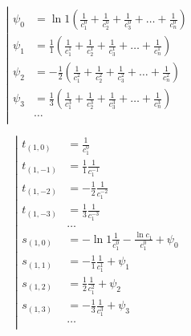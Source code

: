 \begin{equation*} \left| \begin{aligned}
\psi_0 &= \ln{1} \left(
  \frac{1}{c_1^0}
+ \frac{1}{c_2^0}
+ \frac{1}{c_3^0}
+ \ldots
+ \frac{1}{c_n^0} \right) \\
%
\psi_1 &= \frac{1}{1} \left(
  \frac{1}{c_1^1}
+ \frac{1}{c_2^1}
+ \frac{1}{c_3^1}
+ \ldots
+ \frac{1}{c_n^1} \right) \\
%
\psi_2 &= - \frac{1}{2} \left(
  \frac{1}{c_1^2}
+ \frac{1}{c_2^2}
+ \frac{1}{c_3^2}
+ \ldots
+ \frac{1}{c_n^2} \right) \\
%
\psi_3 &= \frac{1}{3} \left(
  \frac{1}{c_1^3}
+ \frac{1}{c_2^3}
+ \frac{1}{c_3^3}
+ \ldots
+ \frac{1}{c_n^3} \right) \\
%
&\ldots \\
\end{aligned} \right. \end{equation*}

\begin{equation*} \left| \begin{aligned}
t_{(1,0)} &=
  \frac{1}{c_1^0} \\
%
t_{(1,-1)} &=
  \frac{1}{1} \frac{1}{c_1^{-1}} \\
%
t_{(1,-2)} &=
  - \frac{1}{2} \frac{1}{c_1^{-2}} \\
%
t_{(1,-3)} &=
  \frac{1}{3} \frac{1}{c_1^{-3}} \\
%
&\ldots \\
%
s_{(1,0)} &=
- \ln{1} \frac{1}{c_1^0}
- \frac{\ln{c_1}}{c_1^0}
+ \psi_0 \\
%
s_{(1,1)} &=
- \frac{1}{1} \frac{1}{c_1^1}
+ \psi_1 \\
%
s_{(1,2)} &=
  \frac{1}{2} \frac{1}{c_1^2}
+ \psi_2 \\
%
s_{(1,3)} &=
- \frac{1}{3} \frac{1}{c_1^3}
+ \psi_3 \\
%
&\ldots \\
\end{aligned} \right. \end{equation*}

